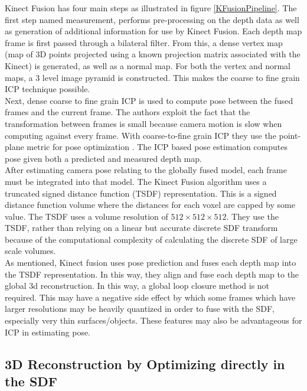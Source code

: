 Kinect Fusion has four main steps as illustrated in figure \ref{KFusionPipeline}. The first step named measurement, performs pre-processing on the depth data as well as generation of additional information for use by Kinect Fusion. Each depth map frame is first passed through a bilateral filter. From this, a dense vertex map (map of 3D points projected using a known projection matrix associated with the Kinect) is generated, as well as a normal map. For both the vertex and normal maps, a 3 level image pyramid is constructed. This makes the coarse to fine grain ICP technique possible. \\

Next, dense coarse to fine grain ICP is used to compute pose between the fused frames and the current frame. The authors exploit the fact that the transformation between frames is small because camera motion is slow when computing against every frame. With coarse-to-fine grain ICP they use the point-plane metric for pose optimization \cite{Rusinkiewicz02Real}. The ICP based pose estimation computes pose given both a predicted and measured depth map. \\

After estimating camera pose relating to the globally fused model, each frame must be integrated into that model. The Kinect Fusion algorithm uses a truncated signed distance function (TSDF) representation. This is a signed distance function volume where the distances for each voxel are capped by some value. The TSDF uses a volume resolution of $512\times 512\times 512$. They use the TSDF, rather than relying on a linear but accurate discrete SDF transform \cite{Rasch09Remarks} because of the computational complexity of calculating the discrete SDF of large scale volumes. \\

As mentioned, Kinect fusion uses pose prediction and fuses each depth map into the TSDF representation. In this way, they align and fuse each depth map to the global 3d reconstruction. In this way, a global loop closure method is not required. This may have a negative side effect by which some frames which have larger resolutions may be heavily quantized in order to fuse with the SDF, especially very thin surfaces/objects. These features may also be advantageous for ICP in estimating pose. 



\subsection{3D Reconstruction by Optimizing directly in the SDF}

